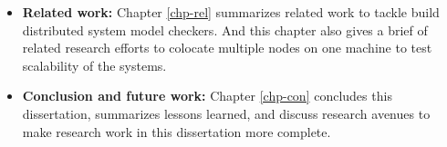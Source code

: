 \begin{itemize}
\item \textbf{Related work:} Chapter \ref{chp-rel} summarizes related work to
tackle build distributed system model checkers. And this chapter also gives a
brief of related research efforts to colocate multiple nodes on one machine to
test scalability of the systems.

\item \textbf{Conclusion and future work:} Chapter \ref{chp-con} concludes this
dissertation, summarizes lessons learned, and discuss research avenues to make
research work in this dissertation more complete.

\end{itemize}
